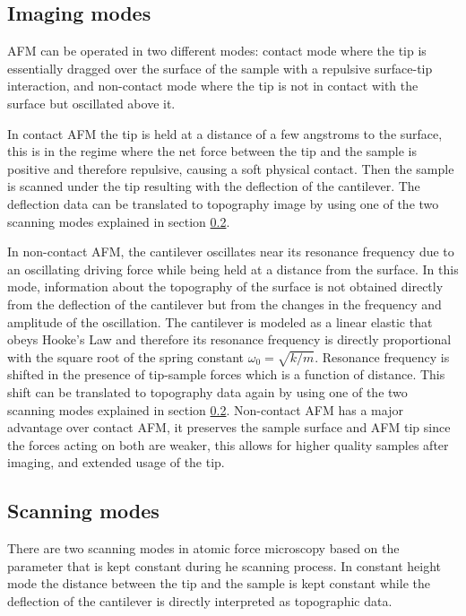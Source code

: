 \documentclass{article}
\begin{document}
\subsection{Imaging modes}
AFM can be operated in two different modes: contact mode where the tip is essentially dragged over the surface of the sample with a repulsive surface-tip interaction, and non-contact mode where the tip is not in contact with the surface but oscillated above it.

In contact AFM the tip is held at a distance of a few angstroms to the surface, this is in the regime where the net force between the tip and the sample is positive and therefore repulsive, causing a soft physical contact. Then the sample is scanned under the tip resulting with the deflection of the cantilever. The deflection data can be translated to topography image by using one of the two scanning modes explained in section \ref{sec:scanning_modes}.

In non-contact AFM, the cantilever oscillates near its resonance frequency due to an oscillating driving force while being held at a distance from the surface. In this mode, information about the topography of the surface is not obtained directly from the deflection of the cantilever but from the changes in the frequency and amplitude of the oscillation. The cantilever is modeled as a linear elastic that obeys Hooke's Law and therefore its resonance frequency is directly proportional with the square root of the spring constant $\omega_0 = \sqrt{k/m}$. Resonance frequency is shifted in the presence of tip-sample forces which is a function of distance. This shift can be translated to topography data again by using one of the two scanning modes explained in section \ref{sec:scanning_modes}. Non-contact AFM has a major advantage over contact AFM, it preserves the sample surface and AFM tip since the forces acting on both are weaker, this allows for higher quality samples after imaging, and extended usage of the tip.


\subsection{Scanning modes}
\label{sec:scanning_modes}
There are two scanning modes in atomic force microscopy based on the parameter that is kept constant during he scanning process. In constant height mode the distance between the tip and the sample is kept constant while the deflection of the cantilever is directly interpreted as topographic data.
\end{document}
